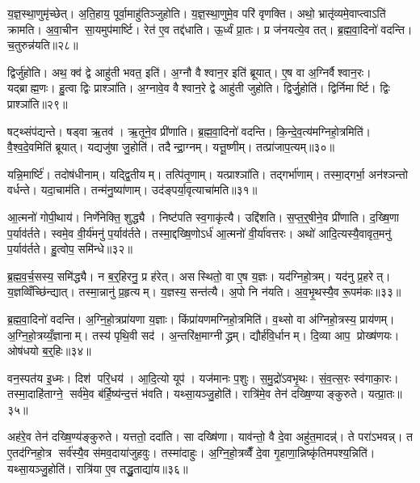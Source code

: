 य॒ज्ञ॒स्था॒णुमृ॑च्छेत्। अ॒ति॒हाय॒ पूर्वा॒माहु॑तिञ्जुहोति। य॒ज्ञ॒स्था॒णुमे॒व परि॑ वृणक्ति। अथो॒ भ्रातृ॑व्यमे॒वाप्त्वाऽति॑ क्रामति। अ॒वा॒चीन सा॒यमुप॑मार्ष्टि। रेत॑ ए॒व तद्द॑धाति। ऊ॒र्ध्वं प्रा॒तः। प्र ज॑नयत्ये॒व तत्। ब्र॒ह्म॒वा॒दिनो॑ वदन्ति। च॒तुरुन्न॑यति॥२८॥

द्विर्जु॑होति। अथ॒ क्व॑ द्वे आहु॑ती भवत॒ इति॑। अ॒ग्नौ वैश्वान॒र इति॑ ब्रूयात्। ए॒ष वा अ॒ग्निर्वैश्वान॒रः। यद्ब्राह्म॒णः। हु॒त्वा द्विः प्राश्ञा॑ति। अ॒ग्नावे॒व वैश्वान॒रे द्वे आहु॑ती जुहोति। द्विर्जु॒होति॑। द्विर्निमार्ष्टि। द्विः प्राश्ञा॑ति॥२९॥

षट्थ्संप॑द्यन्ते। षड्वा ऋ॒तव॑। ऋ॒तूने॒व प्री॑णाति। ब्र॒ह्म॒वा॒दिनो॑ वदन्ति। कि॒न्दे॒व॒त्य॑मग्निहो॒त्रमिति॑। वै॒श्व॒दे॒वमिति॑ ब्रूयात्। यद्यजु॑षा जु॒होति॑। तदैन्द्रा॒ग्नम्। यत्तू॒ष्णीम्। तत्प्रा॑जाप॒त्यम्॥३०॥

यन्नि॒मार्ष्टि॑। तदोष॑धीनाम्। यद्द्वि॒तीयम्। तत्पि॑तृ॒णाम्। यत्प्राश्ञा॑ति। तद्गर्भा॑णाम्। तस्मा॒द्गर्भा॒ अन॑श्ञन्तो वर्धन्ते। यदा॒चाम॑ति। तन्म॑नु॒ष्या॑णाम्। उद॑ङ्पर्या॒वृत्याचा॑मति॥३१॥

आ॒त्मनो॑ गोपी॒थाय॑। निर्णे॑नेक्ति॒ शुद्ध्यै। निष्ट॑पति स्व॒गाकृ॑त्यै। उद्दि॑शति। स॒प्त॒र्॒षीने॒व प्री॑णाति। द॒ख्षि॒णा प॒र्याव॑र्तते। स्वमे॒व वी॒र्य॑मनु॑ प॒र्याव॑र्तते। तस्मा॒द्दख्षि॒णोऽर्ध॑ आ॒त्मनो॑ वी॒र्या॑वत्तरः। अथो॑ आदि॒त्यस्यै॒वावृत॒मनु॑ प॒र्याव॑र्तते। हु॒त्वोप॒ समि॑न्धे॥३२॥

ब्र॒ह्म॒व॒र्च॒सस्य॒ समि॑द्ध्यै। न ब॒र्॒हिरनु॒ प्र ह॑रेत्। असस्थितो॒ वा ए॒ष य॒ज्ञः। यद॑ग्निहो॒त्रम्। यद॑नु प्र॒हरेत्। य॒ज्ञव्विँच्छि॑न्द्यात्। तस्मा॒न्नानु॑ प्र॒हृत्यम्। य॒ज्ञस्य॒ सन्त॑त्यै। अ॒पो नि न॑यति। अ॒व॒भृ॒थस्यै॒व रू॒पम॑कः॥३३॥\anuvakamend[अ॒भ॒व॒न्भ॒व॒ति॒ जु॒हु॒यान्न॑यति मार्ष्टि॒ द्विःप्राश्ञा॑ति प्राजाप॒त्यमाचा॑मतीन्धेऽकः]

ब्र॒ह्म॒वा॒दिनो॑ वदन्ति। अ॒ग्नि॒हो॒त्रप्रा॑यणा य॒ज्ञाः। किंप्रा॑यणमग्निहो॒त्रमिति॑। व॒थ्सो वा अ॑ग्निहो॒त्रस्य॒ प्राय॑णम्। अ॒ग्नि॒हो॒त्रय्यँ॒ज्ञानाम्। तस्य॑ पृथि॒वी सद॑। अ॒न्तरि॑क्ष॒माग्नीद्ध्रम्। द्यौर्\mbox{}ह॑वि॒र्धानम्। दि॒व्या आप॒ प्रोख्ष॑णयः। ओष॑धयो ब॒र्॒हिः॥३४॥

वन॒स्पत॑य इ॒ध्मः। दिश॑ परि॒धय॑। आ॒दि॒त्यो यूप॑। यज॑मानः प॒शुः। स॒मु॒द्रो॑ऽवभृ॒थः। सं॒व॒त्स॒रः स्व॑गाका॒रः। तस्मा॒दाहि॑ताग्ने॒ सर्व॑मे॒व ब॑र्\mbox{}हि॒ष्य॑न्द॒त्तं भ॑वति। यथ्सा॒यञ्जु॒होति॑। रात्रि॑मे॒व तेन॑ दख्षि॒ण्याङ्कुरुते। यत्प्रा॒तः॥३५॥

अह॑रे॒व तेन॑ दख्षि॒ण्य॑ङ्कुरुते। यत्ततो॒ ददा॑ति। सा दख्षि॑णा। याव॑न्तो॒ वै दे॒वा अहु॑त॒मादन्न्॑। ते परा॑ऽभवन्न्। त ए॒तद॑ग्निहो॒त्र सर्व॑स्यै॒व स॑मव॒दाया॑जुहवुः। तस्मा॑दाहुः। अ॒ग्नि॒हो॒त्रव्वैँ दे॒वा गृ॒हाणा॒न्निष्कृ॑तिमपश्य॒न्निति॑। यथ्सा॒यञ्जु॒होति॑। रात्रि॑या ए॒व तद्धु॒ताद्या॑य॥३६॥

